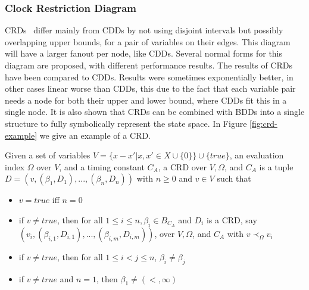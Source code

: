\subsubsection{Clock Restriction Diagram}
CRDs~\cite{crds} differ mainly from CDDs by not using disjoint intervals but possibly overlapping upper bounds, for a pair of variables on their edges. This diagram will have a larger fanout per node, like CDDs. Several normal forms for this diagram are proposed, with different performance results. The results of CRDs have been compared to CDDs. Results were sometimes exponentially better, in other cases linear worse than CDDs, this due to the fact that each variable pair needs a node for both their upper and lower bound, where CDDs fit this in a single node. It is also shown that CRDs can be combined with BDDs into a single structure to fully symbolically represent the state space. In Figure \ref{fig:crd-example} we give an example of a CRD.
\begin{mydef}
Given a set of variables $V=\{x-x'|x,x'\in X \cup \{0\}\}\cup \{true\}$, an evaluation index $\Omega$ over $V$, and a timing constant $C_A$, a CRD over $V, \Omega$, and $C_A$ is a tuple $D = (v,(\beta_1,D_1),...,(\beta_n,D_n))$ with $n  \geq 0$ and $v \in V$ such that
\begin{itemize}
\item $v = true$ iff $n=0$
\item if $v \neq true$, then for all $1 \leq i \leq n, \beta_i \in B_{C_A}$ and $D_i$ is a CRD, say $(v_i,(\beta_{i,1},D_{i,1}),...,(\beta_{i,m},D_{i,m}))$, over $V, \Omega$, and $C_A$ with $v \prec_\Omega v_i$
\item if $v \neq true$, then for all $1 \leq i < j \leq n$, $\beta_i \neq \beta_j$
\item if $v \neq true$ and $n = 1$, then $\beta_1 \neq (<,\infty)$
\end{itemize}
\end{mydef}

